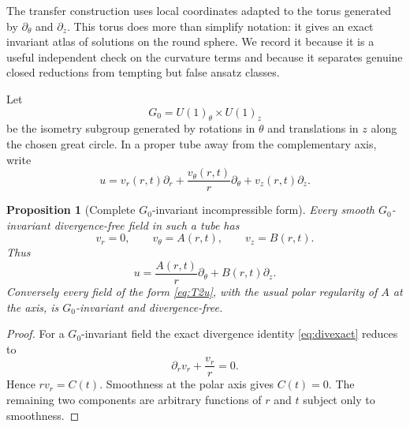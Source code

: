 \documentclass[aps,prd,reprint,superscriptaddress,nofootinbib,floatfix]{revtex4-2}
\newtheorem{proposition}[theorem]{Proposition}
\theoremstyle{definition}
\theoremstyle{remark}
\begin{document}
The transfer construction uses local coordinates adapted to the torus generated by
$\partial_\theta$ and $\partial_z$.  This torus does more than simplify notation:
it gives an exact invariant atlas of solutions on the round sphere.  We record it
because it is a useful independent check on the curvature terms and because it
separates genuine closed reductions from tempting but false ansatz classes.

Let
\begin{equation}
	G_0=U(1)_\theta\times U(1)_z
\end{equation}
be the isometry subgroup generated by rotations in $\theta$ and translations in
$z$ along the chosen great circle.  In a proper tube away from the complementary
axis, write
\begin{equation}
	u=v_r(r,t)\partial_r+\frac{v_\theta(r,t)}{r}\partial_\theta
	+v_z(r,t)\partial_z .
\end{equation}

\begin{proposition}[Complete $G_0$-invariant incompressible form]\label{prop:T2class}
	Every smooth $G_0$-invariant divergence-free field in such a tube has
	\begin{equation}
		v_r=0,\qquad v_\theta=A(r,t),\qquad v_z=B(r,t).
		\label{eq:T2form}
	\end{equation}
	Thus
	\begin{equation}
		u=\frac{A(r,t)}{r}\partial_\theta+B(r,t)\partial_z.
		\label{eq:T2u}
	\end{equation}
	Conversely every field of the form \eqref{eq:T2u}, with the usual polar
	regularity of $A$ at the axis, is $G_0$-invariant and divergence-free.
\end{proposition}

\begin{proof}
	For a $G_0$-invariant field the exact divergence identity
	\eqref{eq:divexact} reduces to
	\[
		\partial_r v_r+\frac{v_r}{r}=0.
	\]
	Hence $rv_r=C(t)$. Smoothness at the polar axis gives $C(t)=0$.
	The remaining two components are arbitrary functions of $r$ and $t$ subject only
	to smoothness.
\end{proof}
\end{document}
